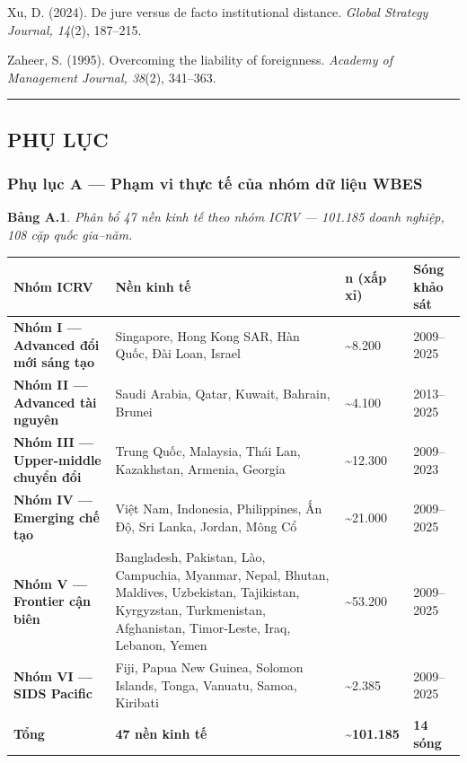 \documentclass[12pt,a4paper]{article}
\begin{document}
Xu, D. (2024). De jure versus de facto institutional distance.
\emph{Global Strategy Journal, 14}(2), 187--215.

Zaheer, S. (1995). Overcoming the liability of foreignness.
\emph{Academy of Management Journal, 38}(2), 341--363.

\begin{center}\rule{0.5\linewidth}{0.5pt}\end{center}

\hypertarget{phux1ee5-lux1ee5c}{%
\subsection{PHỤ LỤC}\label{phux1ee5-lux1ee5c}}

\hypertarget{phux1ee5-lux1ee5c-a--phux1ea1m-vi-thux1ef1c-tux1ebf-cux1ee7a-nhuxf3m-dux1eef-liux1ec7u-wbes}{%
\subsubsection{Phụ lục A --- Phạm vi thực tế của nhóm dữ liệu
WBES}\label{phux1ee5-lux1ee5c-a--phux1ea1m-vi-thux1ef1c-tux1ebf-cux1ee7a-nhuxf3m-dux1eef-liux1ec7u-wbes}}

\textbf{Bảng A.1}. \emph{Phân bổ 47 nền kinh tế theo nhóm ICRV ---
101.185 doanh nghiệp, 108 cặp quốc gia--năm.}

\begin{longtable}[]{@{}llll@{}}
\toprule\noalign{}
Nhóm ICRV & Nền kinh tế & n (xấp xỉ) & Sóng khảo sát \\
\midrule\noalign{}
\endhead
\bottomrule\noalign{}
\endlastfoot
\textbf{Nhóm I --- Advanced đổi mới sáng tạo} & Singapore, Hong Kong
SAR, Hàn Quốc, Đài Loan, Israel & \textasciitilde8.200 & 2009--2025 \\
\textbf{Nhóm II --- Advanced tài nguyên} & Saudi Arabia, Qatar, Kuwait,
Bahrain, Brunei & \textasciitilde4.100 & 2013--2025 \\
\textbf{Nhóm III --- Upper-middle chuyển đổi} & Trung Quốc, Malaysia,
Thái Lan, Kazakhstan, Armenia, Georgia & \textasciitilde12.300 &
2009--2023 \\
\textbf{Nhóm IV --- Emerging chế tạo} & Việt Nam, Indonesia,
Philippines, Ấn Độ, Sri Lanka, Jordan, Mông Cổ & \textasciitilde21.000 &
2009--2025 \\
\textbf{Nhóm V --- Frontier cận biên} & Bangladesh, Pakistan, Lào,
Campuchia, Myanmar, Nepal, Bhutan, Maldives, Uzbekistan, Tajikistan,
Kyrgyzstan, Turkmenistan, Afghanistan, Timor-Leste, Iraq, Lebanon, Yemen
& \textasciitilde53.200 & 2009--2025 \\
\textbf{Nhóm VI --- SIDS Pacific} & Fiji, Papua New Guinea, Solomon
Islands, Tonga, Vanuatu, Samoa, Kiribati & \textasciitilde2.385 &
2009--2025 \\
\textbf{Tổng} & \textbf{47 nền kinh tế} &
\textbf{\textasciitilde101.185} & \textbf{14 sóng} \\
\end{longtable}
\end{document}
